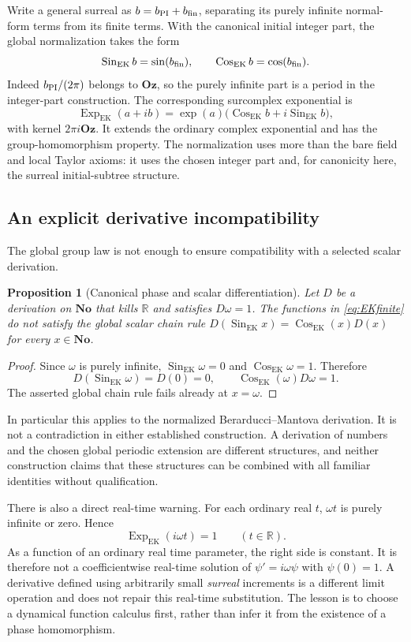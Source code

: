 \documentclass[11pt,a4paper]{article}
\numberwithin{equation}{section}
\newtheorem{proposition}[theorem]{Proposition}
\theoremstyle{definition}
\theoremstyle{remark}
\newcommand{\R}{\mathbb R}
\newcommand{\No}{\mathbf{No}}
\newcommand{\Oz}{\mathbf{Oz}}
\newcommand{\ExpEK}{\operatorname{Exp}_{\mathrm{EK}}}
\newcommand{\sinEK}{\operatorname{Sin}_{\mathrm{EK}}}
\newcommand{\cosEK}{\operatorname{Cos}_{\mathrm{EK}}}
\begin{document}
Write a general surreal as $b=b_{\rm PI}+b_{\rm fin}$, separating its purely
infinite normal-form terms from its finite terms. With the canonical initial
integer part, the global normalization takes the form
\begin{equation}\label{eq:EKfinite}
\sinEK b=\sin(b_{\rm fin}),\qquad
\cosEK b=\cos(b_{\rm fin}).
\end{equation}
Indeed $b_{\rm PI}/(2\pi)$ belongs to $\Oz$, so the purely infinite part is a
period in the integer-part construction. The corresponding surcomplex
exponential is
\begin{equation}\label{eq:EKexp}
\ExpEK(a+ib)=\exp(a)\bigl(\cosEK b+i\sinEK b\bigr),
\end{equation}
with kernel $2\pi i\Oz$. It extends the ordinary complex exponential and has
the group-homomorphism property. The normalization uses more than the bare
field and local Taylor axioms: it uses the chosen integer part and, for
canonicity here, the surreal initial-subtree structure.

\subsection{An explicit derivative incompatibility}
The global group law is not enough to ensure compatibility with a selected
scalar derivation.

\begin{proposition}[Canonical phase and scalar differentiation]\label{prop:phase}
Let $D$ be a derivation on $\No$ that kills $\R$ and satisfies $D\omega=1$.
The functions in \eqref{eq:EKfinite} do not satisfy the global scalar chain rule
$D(\sinEK x)=\cosEK(x)D(x)$ for every $x\in\No$.
\end{proposition}
\begin{proof}
Since $\omega$ is purely infinite, $\sinEK\omega=0$ and
$\cosEK\omega=1$. Therefore
\[
D(\sinEK\omega)=D(0)=0,
\qquad \cosEK(\omega)D\omega=1.
\]
The asserted global chain rule fails already at $x=\omega$.
\end{proof}

In particular this applies to the normalized Berarducci--Mantova derivation.
It is not a contradiction in either established construction. A derivation of
numbers and the chosen global periodic extension are different structures,
and neither construction claims that these structures can be combined with
all familiar identities without qualification.

There is also a direct real-time warning. For each ordinary real $t$,
$\omega t$ is purely infinite or zero. Hence
\begin{equation}\label{eq:constantphase}
\ExpEK(i\omega t)=1\qquad(t\in\R).
\end{equation}
As a function of an ordinary real time parameter, the right side is constant.
It is therefore not a coefficientwise real-time solution of
$\psi'=i\omega\psi$ with $\psi(0)=1$. A derivative defined using arbitrarily
small \emph{surreal} increments is a different limit operation and does not
repair this real-time substitution. The lesson is to choose a dynamical
function calculus first, rather than infer it from the existence of a phase
homomorphism.
\end{document}
